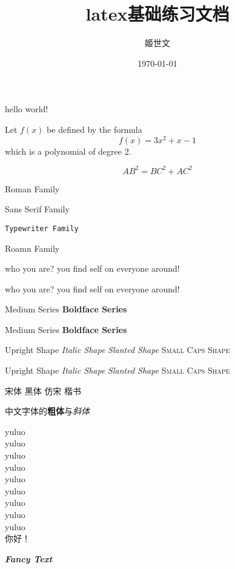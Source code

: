 \documentclass[12]{article} %
\title{latex基础练习文档}
\author{\kaishu 姬世文}
\date{\today}
\newcommand{\myfont}{\textit{\textbf{\textsf{Fancy Text}}}}
\begin{document}
	\maketitle

	hello world!

	Let $f(x)$ be defined by the formula
	$$f(x)=3x^2+x-1$$ which is a polynomial of degree 2.

	\begin{equation}
	AB^2 = BC^2 + AC^2
	\end{equation}


	\textrm{Roman Family}

	\textsf{Sans Serif Family}

	\texttt{Typewriter Family}

	\rmfamily Roamn Family

	{\sffamily who you are? you find self on everyone around!}
	
	{\ttfamily who you are? you find self on everyone around!}
	
	\textmd{Medium Series} \textbf{Boldface Series}

	{\mdseries Medium Series} {\bfseries Boldface Series}


	\textup{Upright Shape} \textit{Italic Shape}
	\textsl{Slanted Shape} \textsc{Small Caps Shape}

	{\upshape Upright Shape} {\itshape Italic Shape} 
	{\slshape Slanted Shape} {\scshape Small Caps Shape}
	
	{\songti 宋体} \quad
	{\heiti 黑体} \quad
	{\fangsong 仿宋} \quad
	{\kaishu 楷书} \quad

	中文字体的\textbf{粗体}与\textit{斜体}

	{\tiny 				yuluo}\\
	{\scriptsize 		yuluo}\\
	{\footnotesize  yuluo}\\
	{\small				yuluo}\\
	{\normalsize    yuluo}\\
	{\large 			yuluo}\\
	{\Large 			yuluo}\\
	{\huge 				yuluo}\\
	{\Huge				yuluo}\\

	 你好！

	\myfont
\end{document}
